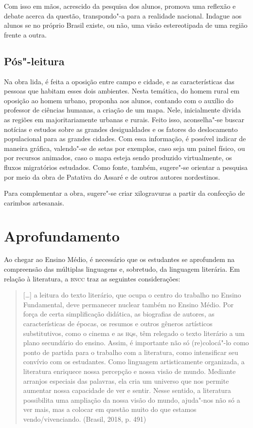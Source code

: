 \documentclass[12pt]{extarticle}
\begin{document}
Com isso em mãos, acrescido da pesquisa dos alunos, promova uma reflexão
e debate acerca da questão, transpondo"-a para a realidade nacional.
Indague aos alunos se no próprio Brasil existe, ou não, uma visão
estereotipada de uma região frente a outra.

\subsection{Pós"-leitura}

Na obra lida, é feita a oposição entre campo e cidade, e as
características das pessoas que habitam esses dois ambientes. Nesta
temática, do homem rural em oposição ao homem urbano, proponha aos
alunos, contando com o auxílio do professor de ciências humanas, a
criação de um mapa. Nele, inicialmente divida as regiões em
majoritariamente urbanas e rurais. Feito isso, aconselha"-se buscar
notícias e estudos sobre as grandes desigualdades e os fatores do
deslocamento populacional para as grandes cidades. Com essa informação,
é possível indicar de maneira gráfica, valendo"-se de setas por exemplos,
caso seja um painel físico, ou por recursos animados, caso o mapa esteja
sendo produzido virtualmente, os fluxos migratórios estudados. Como
fonte, também, sugere"-se orientar a pesquisa por meio da obra de
Patativa do Assaré e de outros autores nordestinos.

Para complementar a obra, sugere"-se criar xilogravuras a partir da
confecção de carimbos artesanais.

\section{Aprofundamento}

Ao chegar ao Ensino Médio, é necessário que os estudantes se aprofundem
na compreensão das múltiplas linguagens e, sobretudo, da linguagem
literária. Em relação à literatura, a \textsc{bncc} traz as seguintes
considerações:

\begin{quote}
{[}\ldots{}{]} a leitura do texto literário, que ocupa o centro do trabalho
no Ensino Fundamental, deve permanecer nuclear também no Ensino Médio.
Por força de certa simplificação didática, as biografias de autores, as
características de épocas, os resumos e outros gêneros artísticos
substitutivos, como o cinema e as \textsc{hq}s, têm relegado o texto literário a
um plano secundário do ensino. Assim, é importante não só (re)colocá"-lo
como ponto de partida para o trabalho com a literatura, como
intensificar seu convívio com os estudantes. Como linguagem
artisticamente organizada, a literatura enriquece nossa percepção e
nossa visão de mundo. Mediante arranjos especiais das palavras, ela cria
um universo que nos permite aumentar nossa capacidade de ver e sentir.
Nesse sentido, a literatura possibilita uma ampliação da nossa visão do
mundo, ajuda"-nos não só a ver mais, mas a colocar em questão muito do
que estamos vendo/vivenciando. (Brasil, 2018, p. 491)
\end{quote}
\end{document}
